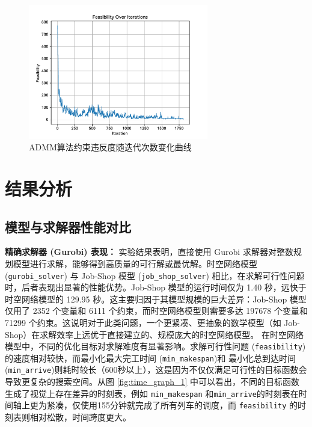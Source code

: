 \documentclass{article}
\begin{document}
\begin{figure}
    \centering
    \includegraphics[width = 0.7\textwidth]{fig/admm_feas}
    \caption{ADMM算法约束违反度随迭代次数变化曲线}
    \label{fig:admm_infeasibility}
\end{figure}

\section{结果分析}

\subsection{模型与求解器性能对比}

\textbf{精确求解器 (Gurobi) 表现：}
实验结果表明，直接使用 Gurobi 求解器对整数规划模型进行求解，能够得到高质量的可行解或最优解。时空网络模型
(\texttt{gurobi\_solver}) 与 Job-Shop 模型 (\texttt{job\_shop\_solver})
相比，在求解可行性问题时，后者表现出显著的性能优势。Job-Shop 模型的运行时间仅为 1.40 秒，远快于时空网络模型的 129.95
秒。这主要归因于其模型规模的巨大差异：Job-Shop 模型仅用了 2352 个变量和 6111 个约束，而时空网络模型则需要多达
197678 个变量和 71299 个约束。这说明对于此类问题，一个更紧凑、更抽象的数学模型（如
Job-Shop）在求解效率上远优于直接建立的、规模庞大的时空网络模型。
在时空网络模型中，不同的优化目标对求解难度有显著影响。求解可行性问题
(\texttt{feasibility})的速度相对较快，而最小化最大完工时间 (\texttt{min\_makespan})和
最小化总到达时间
(\texttt{min\_arrive})则耗时较长（600秒以上），这是因为不仅仅满足可行性的目标函数会导致更复杂的搜索空间。从图
\ref{fig:time_graph_1}
中可以看出，不同的目标函数生成了视觉上存在差异的时刻表，例如 \texttt{min\_makespan}
和\texttt{min\_arrive}的时刻表在时间轴上更为紧凑，仅使用155分钟就完成了所有列车的调度，而
\texttt{feasibility} 的时刻表则相对松散，时间跨度更大。
\end{document}
